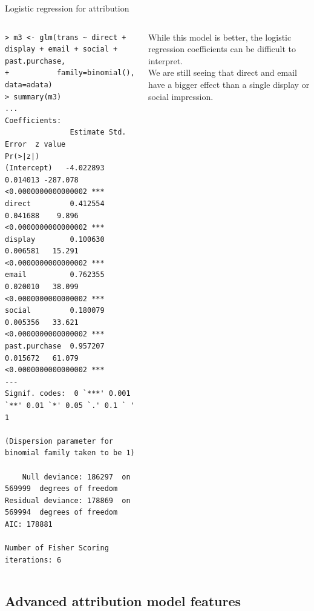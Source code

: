 \documentclass[10pt, aspectratio=169]{beamer}
\begin{document}
\begin{frame}[fragile]{Logistic regression for attribution}
\begin{columns}[t]
\begin{lstlisting}[basicstyle=\tiny\ttfamily]
> m3 <- glm(trans ~ direct + display + email + social + past.purchase, 
+           family=binomial(), data=adata)
> summary(m3)
...
Coefficients:
               Estimate Std. Error  z value            Pr(>|z|)    
(Intercept)   -4.022893   0.014013 -287.078 <0.0000000000000002 ***
direct         0.412554   0.041688    9.896 <0.0000000000000002 ***
display        0.100630   0.006581   15.291 <0.0000000000000002 ***
email          0.762355   0.020010   38.099 <0.0000000000000002 ***
social         0.180079   0.005356   33.621 <0.0000000000000002 ***
past.purchase  0.957207   0.015672   61.079 <0.0000000000000002 ***
---
Signif. codes:  0 `***' 0.001 `**' 0.01 `*' 0.05 `.' 0.1 ` ' 1

(Dispersion parameter for binomial family taken to be 1)

    Null deviance: 186297  on 569999  degrees of freedom
Residual deviance: 178869  on 569994  degrees of freedom
AIC: 178881

Number of Fisher Scoring iterations: 6
\end{lstlisting}
While this model is better, the logistic regression coefficients can be difficult to interpret. \\
\bigskip \pause
We are still seeing that direct and email have a bigger effect than a single display or social impression.
\end{columns}
\end{frame}

\subsection{Advanced attribution model features}
\end{document}
